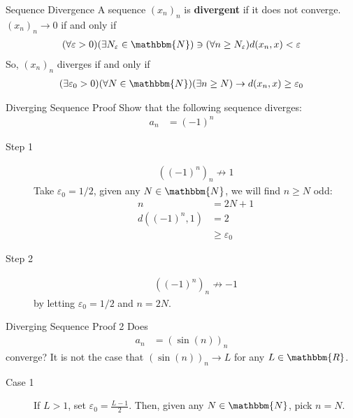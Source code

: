 \documentclass[10pt]{extarticle}
\newcommand{\N}{\mathbbm{N}}
\newcommand{\R}{\mathbbm{R}}
\begin{document}
  \begin{problem}{Sequence Divergence}
    A sequence $(x_n)_n$ is \textbf{divergent} if it does not converge. $(x_n)_n \rightarrow 0$ if and only if
    \begin{align*}
      (\forall \varepsilon > 0)(\exists N_{\varepsilon} \in \N) \ni (\forall n\geq N_{\varepsilon}) d(x_n,x) < \varepsilon
    \end{align*}
    So, $(x_n)_n$ diverges if and only if
    \begin{align*}
      (\exists \varepsilon_0 > 0)(\forall N\in\N) (\exists n\geq N) \rightarrow d(x_n,x)\geq \varepsilon_0
    \end{align*}
    \begin{problem}{Diverging Sequence Proof}
      Show that the following sequence diverges:
      \begin{align*}
        a_n &= (-1)^n
      \end{align*}
      \tcblower
      \begin{description}
        \item[Step 1]
          \begin{align*}
            \left((-1)^n\right)_n \not\rightarrow 1
          \end{align*}
          Take $\varepsilon_0 = 1/2$, given any $N\in\N$, we will find $n\geq N$ odd:
          \begin{align*}
            n &= 2N+1\\
            d((-1)^n,1) &= 2\\
                        &\geq \varepsilon_0
          \end{align*}
        \item[Step 2]
          \begin{align*}
            \left((-1)^n\right)_n \not\rightarrow -1
          \end{align*}
          by letting $\varepsilon_0 = 1/2$ and $n = 2N$.
      \end{description}
    \end{problem}
    \begin{problem}{Diverging Sequence Proof 2}
      Does
      \begin{align*}
        a_n &= \left(\sin(n)\right)_n
      \end{align*}
      converge?
      \tcblower
      It is not the case that $\left(\sin(n)\right)_n \rightarrow L$ for any $L\in\R$.
      \begin{description}
        \item[Case 1] If $L > 1$, set $\varepsilon_0 = \frac{L-1}{2}$. Then, given any $N\in\N$, pick $n = N$.

\end{description}
\end{problem}
\end{problem}
\end{document}

